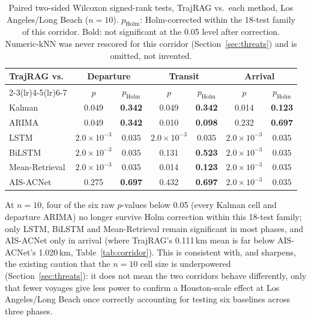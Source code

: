 \begin{table}[t]
\centering
\caption{Paired two-sided Wilcoxon signed-rank tests, TrajRAG vs.\ each
method, Los Angeles/Long Beach ($n=10$). $p_{\text{Holm}}$: Holm-corrected
within the 18-test family of this corridor. Bold: not significant at the
0.05 level after correction. Numeric-kNN was never rescored for this
corridor (Section~\ref{sec:threats}) and is omitted, not invented.}
\label{tab:wilcoxon-la}
\footnotesize
\setlength{\tabcolsep}{3pt}
\begin{tabular}{lcccccc}
\toprule
\multirow{2}{*}{TrajRAG vs.} & \multicolumn{2}{c}{Departure} & \multicolumn{2}{c}{Transit} & \multicolumn{2}{c}{Arrival} \\
\cmidrule(lr){2-3}\cmidrule(lr){4-5}\cmidrule(lr){6-7}
 & $p$ & $p_{\text{Holm}}$ & $p$ & $p_{\text{Holm}}$ & $p$ & $p_{\text{Holm}}$ \\
\midrule
Kalman & 0.049 & \textbf{0.342} & 0.049 & \textbf{0.342} & 0.014 & \textbf{0.123} \\
ARIMA & 0.049 & \textbf{0.342} & 0.010 & \textbf{0.098} & 0.232 & \textbf{0.697} \\
LSTM & $2.0 \times 10^{-3}$ & $0.035$ & $2.0 \times 10^{-3}$ & $0.035$ & $2.0 \times 10^{-3}$ & $0.035$ \\
BiLSTM & $2.0 \times 10^{-3}$ & $0.035$ & 0.131 & \textbf{0.523} & $2.0 \times 10^{-3}$ & $0.035$ \\
Mean-Retrieval & $2.0 \times 10^{-3}$ & $0.035$ & 0.014 & \textbf{0.123} & $2.0 \times 10^{-3}$ & $0.035$ \\
AIS-ACNet & 0.275 & \textbf{0.697} & 0.432 & \textbf{0.697} & $2.0 \times 10^{-3}$ & $0.035$ \\
\bottomrule
\end{tabular}
\end{table}

At $n=10$, four of the six raw $p$-values below 0.05 (every Kalman cell and
departure ARIMA) no longer survive Holm correction within this 18-test
family; only LSTM, BiLSTM and Mean-Retrieval remain significant in most
phases, and AIS-ACNet only in arrival (where TrajRAG's 0.111\,km mean is
far below AIS-ACNet's 1.020\,km, Table~\ref{tab:corridor}). This is
consistent with, and sharpens, the existing caution that the $n=10$ cell
size is underpowered (Section~\ref{sec:threats}): it does not mean the two
corridors behave differently, only that fewer voyages give less power to
confirm a Houston-scale effect at Los Angeles/Long Beach once correctly
accounting for testing six baselines across three phases.

